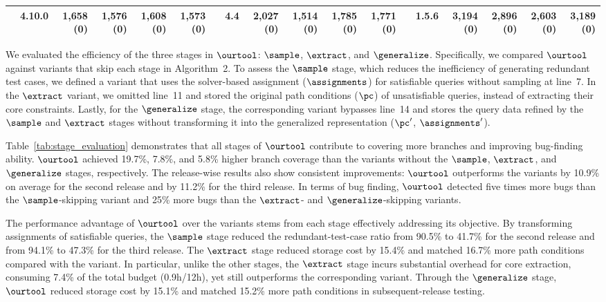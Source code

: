 \begin{table}[]
{\begin{tabular}{l|l|rrrr||l|l|rrrr||l|l|rrrr}
                                 & 4.10.0                       & \multicolumn{1}{r|}{\textbf{1,658 (0)}} & \multicolumn{1}{r|}{1,576 (0)} & \multicolumn{1}{r|}{1,608 (0)} & 1,573 (0)                        &                              & 4.4                          & \multicolumn{1}{r|}{\textbf{2,027 (0)}} & \multicolumn{1}{r|}{1,514 (0)} & \multicolumn{1}{r|}{1,785 (0)} & 1,771 (0)                        &                              & 1.5.6                        & \multicolumn{1}{r|}{\textbf{3,194 (0)}} & \multicolumn{1}{r|}{2,896 (0)} & \multicolumn{1}{r|}{2,603 (0)} & 3,189 (0)                       \\ \midrule \bottomrule
    \end{tabular}%
    }
\end{table}


We evaluated the efficiency of the three stages in $\ourtool$: $\sample$, $\extract$, and $\generalize$. Specifically, we compared $\ourtool$ against variants that skip each stage in Algorithm~2. To assess the $\sample$ stage, which reduces the inefficiency of generating redundant test cases, we defined a variant that uses the solver-based assignment ($\assignments$) for satisfiable queries without sampling at line~7. In the $\extract$ variant, we omitted line~11 and stored the original path conditions ($\pc$) of unsatisfiable queries, instead of extracting their core constraints. Lastly, for the $\generalize$ stage, the corresponding variant bypasses line~14 and stores the query data refined by the $\sample$ and $\extract$ stages without transforming it into the generalized representation ($\pc'$, $\assignments'$).

Table~\ref{tab:stage_evaluation} demonstrates that all stages of $\ourtool$ contribute to covering more branches and improving bug-finding ability. $\ourtool$ achieved 19.7\%, 7.8\%, and 5.8\% higher branch coverage than the variants without the $\sample$, $\extract$, and $\generalize$ stages, respectively. The release-wise results also show consistent improvements: $\ourtool$ outperforms the variants by 10.9\% on average for the second release and by 11.2\% for the third release. In terms of bug finding, $\ourtool$ detected five times more bugs than the $\sample$-skipping variant and 25\% more bugs than the $\extract$- and $\generalize$-skipping variants.

The performance advantage of $\ourtool$ over the variants stems from each stage effectively addressing its objective. By transforming assignments of satisfiable queries, the $\sample$ stage reduced the redundant-test-case ratio from 90.5\% to 41.7\% for the second release and from 94.1\% to 47.3\% for the third release. The $\extract$ stage reduced storage cost by 15.4\% and matched 16.7\% more path conditions compared with the variant. In particular, unlike the other stages, the $\extract$ stage incurs substantial overhead for core extraction, consuming 7.4\% of the total budget (0.9h/12h), yet still outperforms the corresponding variant. Through the $\generalize$ stage, $\ourtool$ reduced storage cost by 15.1\% and matched 15.2\% more path conditions in subsequent-release testing.

